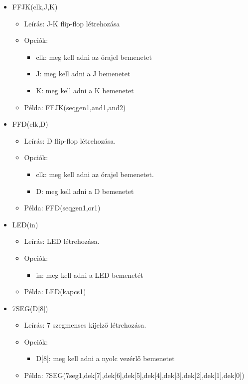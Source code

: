 \begin{itemize}
\item FFJK(clk,J,K)
	\begin{itemize}
	\item Leírás: J-K flip-flop létrehozása
	\item Opciók: 
		\begin{itemize}
			\item clk: meg kell adni az órajel bemenetet
			\item J: meg kell adni a J bemenetet
			\item K: meg kell adni a K bemenetet
		\end{itemize}
	\item Példa: FFJK(seqgen1,and1,and2)
	\end{itemize}

\item FFD(clk,D)
	\begin{itemize}
	\item Leírás: D flip-flop létrehozása.
	\item Opciók: 
		\begin{itemize}
			\item clk: meg kell adni az órajel bemenetet.
			\item D: meg kell adni a D bemenetet
		\end{itemize}
	\item Példa: FFD(seqgen1,or1)
	\end{itemize}
	
\item LED(in)
	\begin{itemize}
	\item Leírás: LED létrehozása.
	\item Opciók: 
		\begin{itemize}
			\item in: meg kell adni a LED bemenetét
		\end{itemize}
	\item Példa: LED(kapcs1)
	\end{itemize}

\item 7SEG(D[8])
	\begin{itemize}
	\item Leírás: 7 szegmenses kijelző létrehozása.
	\item Opciók: 
		\begin{itemize}
			\item D[8]: meg kell adni a nyolc vezérlő bemenetet
		\end{itemize}
	\item Példa: 7SEG(7seg1,dek[7],dek[6],dek[5],dek[4],dek[3],dek[2],dek[1],dek[0])
	\end{itemize}
	

\end{itemize}
